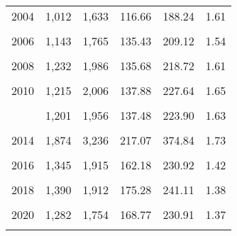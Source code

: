 \documentclass[
]{krantz}
\begin{document}
\begin{longtable}[t]{cccccc}
2004 & 1,012 & 1,633 & 116.66 & 188.24 & 1.61\\
\cellcolor{gray!6}{2005} & \cellcolor{gray!6}{996} & \cellcolor{gray!6}{1,569} & \cellcolor{gray!6}{117.36} & \cellcolor{gray!6}{184.87} & \cellcolor{gray!6}{1.58}\\
2006 & 1,143 & 1,765 & 135.43 & 209.12 & 1.54\\
\addlinespace
\cellcolor{gray!6}{2007} & \cellcolor{gray!6}{1,113} & \cellcolor{gray!6}{1,778} & \cellcolor{gray!6}{126.41} & \cellcolor{gray!6}{201.93} & \cellcolor{gray!6}{1.60}\\
2008 & 1,232 & 1,986 & 135.68 & 218.72 & 1.61\\
\cellcolor{gray!6}{2009} & \cellcolor{gray!6}{1,236} & \cellcolor{gray!6}{2,033} & \cellcolor{gray!6}{138.46} & \cellcolor{gray!6}{227.74} & \cellcolor{gray!6}{1.64}\\
2010 & 1,215 & 2,006 & 137.88 & 227.64 & 1.65\\
\cellcolor{gray!6}{2011} & \cellcolor{gray!6}{1,272} & \cellcolor{gray!6}{2,103} & \cellcolor{gray!6}{143.45} & \cellcolor{gray!6}{237.17} & \cellcolor{gray!6}{1.65}\\
\addlinespace
2012 & 1,201 & 1,956 & 137.48 & 223.90 & 1.63\\
\cellcolor{gray!6}{2013} & \cellcolor{gray!6}{1,417} & \cellcolor{gray!6}{2,270} & \cellcolor{gray!6}{168.23} & \cellcolor{gray!6}{269.50} & \cellcolor{gray!6}{1.60}\\
2014 & 1,874 & 3,236 & 217.07 & 374.84 & 1.73\\
\cellcolor{gray!6}{2015} & \cellcolor{gray!6}{1,529} & \cellcolor{gray!6}{2,220} & \cellcolor{gray!6}{187.47} & \cellcolor{gray!6}{272.19} & \cellcolor{gray!6}{1.45}\\
2016 & 1,345 & 1,915 & 162.18 & 230.92 & 1.42\\
\addlinespace
\cellcolor{gray!6}{2017} & \cellcolor{gray!6}{1,289} & \cellcolor{gray!6}{1,758} & \cellcolor{gray!6}{156.72} & \cellcolor{gray!6}{213.74} & \cellcolor{gray!6}{1.36}\\
2018 & 1,390 & 1,912 & 175.28 & 241.11 & 1.38\\
\cellcolor{gray!6}{2019} & \cellcolor{gray!6}{1,442} & \cellcolor{gray!6}{2,011} & \cellcolor{gray!6}{179.02} & \cellcolor{gray!6}{249.66} & \cellcolor{gray!6}{1.39}\\
2020 & 1,282 & 1,754 & 168.77 & 230.91 & 1.37\\
\cellcolor{gray!6}{2021} & \cellcolor{gray!6}{1,378} & \cellcolor{gray!6}{1,908} & \cellcolor{gray!6}{169.79} & \cellcolor{gray!6}{235.09} & \cellcolor{gray!6}{1.38}\\*
\end{longtable}
\endgroup{}
\end{document}
